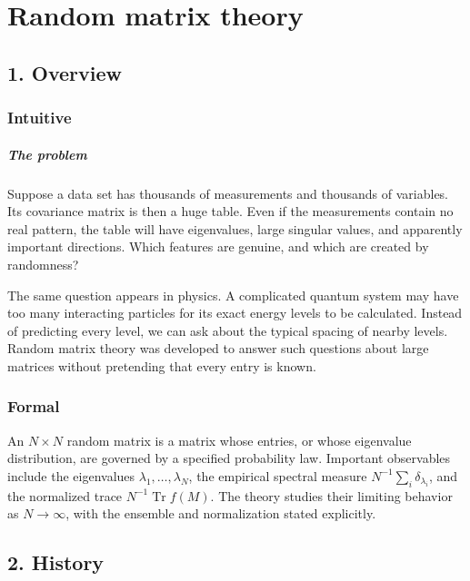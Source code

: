 \clearpage\chapter{Random matrix theory}

\section*{1. Overview}
\subsection*{Intuitive}
\paragraph{The problem}
Suppose a data set has thousands of measurements and thousands of variables.
Its covariance matrix is then a huge table.  Even if the measurements contain
no real pattern, the table will have eigenvalues, large singular values, and
apparently important directions.  Which features are genuine, and which are
created by randomness?

The same question appears in physics.  A complicated quantum system may have
too many interacting particles for its exact energy levels to be calculated.
Instead of predicting every level, we can ask about the typical spacing of
nearby levels.  Random matrix theory was developed to answer such questions
about large matrices without pretending that every entry is known.


\subsection*{Formal}
An $N\times N$ random matrix is a matrix whose entries, or whose eigenvalue distribution, are governed by a specified probability law. Important observables include the eigenvalues $\lambda_1,\ldots,\lambda_N$, the empirical spectral measure $N^{-1}\sum_i\delta_{\lambda_i}$, and the normalized trace $N^{-1}\operatorname{Tr}f(M)$. The theory studies their limiting behavior as $N\to\infty$, with the ensemble and normalization stated explicitly.
\section*{2. History}
